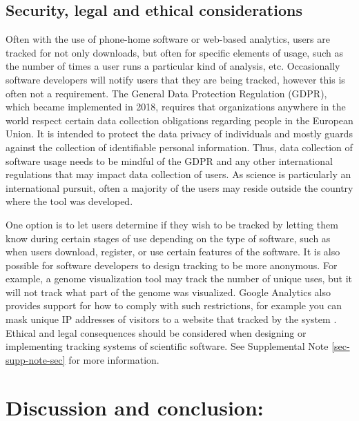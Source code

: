 \documentclass{article}
\begin{document}
\subsection{Security, legal and ethical considerations}\label{sec:legal_ethics}
Often with the use of phone-home software or web-based analytics, users are tracked for not only downloads, but often for specific elements of usage, such as the number of times a user runs a particular kind of analysis, etc. Occasionally software developers will notify users that they are being tracked, however this is often not a requirement. The General Data Protection Regulation (GDPR), which became implemented in 2018, requires that organizations anywhere in the world respect certain data collection obligations regarding people in the European Union. It is intended to protect the data privacy of individuals and mostly guards against the collection of identifiable personal information. Thus, data collection of software usage needs to be mindful of the GDPR and any other international regulations that may impact data collection of users.  As science is particularly an international pursuit, often a majority of the users may reside outside the country where the tool was developed.

One option is to let users determine if they wish to be tracked by letting them know during certain stages of use depending on the type of software, such as when users download, register, or use certain features of the software. It is also possible for software developers to design tracking to be more anonymous. For example, a genome visualization tool may track the number of unique uses, but it will not track what part of the genome was visualized. Google Analytics also provides support for how to comply with such restrictions, for example you can  mask unique IP addresses of visitors to a website that tracked by the system \cite{google_analytics_privacy}.  Ethical and legal consequences should be considered when designing or implementing tracking systems of scientific software. See Supplemental Note \ref{sec-supp-note-sec} for more information.



\section{Discussion and conclusion:}
\end{document}

